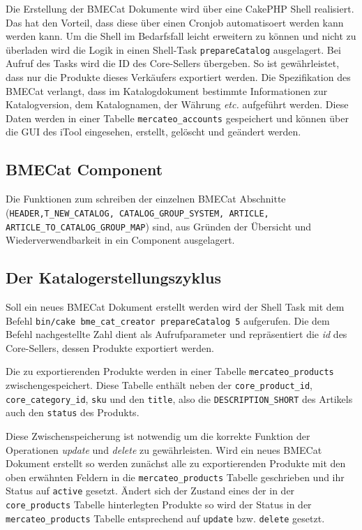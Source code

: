 Die Erstellung der BMECat Dokumente wird über eine CakePHP Shell realisiert. Das hat den Vorteil, dass diese über einen Cronjob automatisoert werden kann werden kann. Um die Shell im Bedarfsfall leicht erweitern zu können und nicht zu überladen wird die Logik in einen Shell-Task \texttt{prepareCatalog} ausgelagert. Bei Aufruf des Tasks wird die ID des Core-Sellers übergeben. So ist gewährleistet, dass nur die Produkte dieses Verkäufers exportiert werden. Die Spezifikation des BMECat verlangt, dass im Katalogdokument bestimmte Informationen zur Katalogversion, dem Katalognamen, der Währung \textit{etc.} aufgeführt werden. Diese Daten werden in einer Tabelle \texttt{mercateo\_accounts} gespeichert und können über die GUI des iTool eingesehen, erstellt, gelöscht und geändert werden. 
	
	\subsection{BMECat Component}
	Die Funktionen zum schreiben der einzelnen BMECat Abschnitte (\texttt{HEADER,T\_NEW\_CATALOG, CATALOG\_GROUP\_SYSTEM, ARTICLE, ARTICLE\_TO\_CATALOG\_GROUP\_MAP}) sind, aus Gründen der Übersicht und Wiederverwendbarkeit in ein Component ausgelagert. 
	
	\subsection{Der Katalogerstellungszyklus}
	
	Soll ein neues BMECat Dokument erstellt werden wird der Shell Task mit dem Befehl \texttt{bin/cake bme\_cat\_creator prepareCatalog 5} aufgerufen. Die dem Befehl nachgestellte Zahl dient als Aufrufparameter und repräsentiert die \textit{id} des Core-Sellers, dessen Produkte exportiert werden.
	
	Die zu exportierenden Produkte werden in einer Tabelle \texttt{mercateo\_products} zwischengespeichert. Diese Tabelle enthält neben der \texttt{core\_product\_id},  \texttt{core\_category\_id}, \texttt{sku} und den \texttt{title}, also die \texttt{DESCRIPTION\_SHORT} des Artikels auch den \texttt{status} des Produkts.
	
	Diese Zwischenspeicherung ist notwendig um die korrekte Funktion der Operationen \textit{update} und \textit{delete} zu gewährleisten. Wird ein neues BMECat Dokument erstellt so werden zunächst alle zu exportierenden Produkte mit den oben erwähnten Feldern in die \texttt{mercateo\_products} Tabelle geschrieben und ihr Status auf \texttt{active} gesetzt. Ändert sich der Zustand eines der in der \texttt{core\_products} Tabelle hinterlegten Produkte so wird der Status in der \texttt{mercateo\_products} Tabelle entsprechend auf \texttt{update} bzw. \texttt{delete} gesetzt.
	
